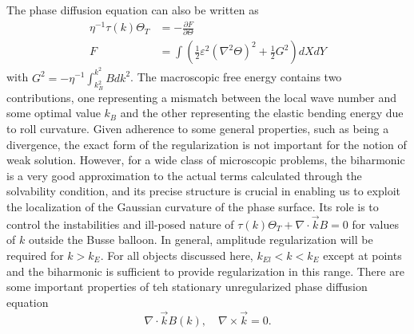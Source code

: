 \documentclass[12pt]{article}
\newcounter{problem}
\newcounter{solution}
\begin{document}
The phase diffusion equation can also be written as
\begin{align*}
    \eta^{-1}\tau(k)\Theta_T &= -\frac{\partial F}{\partial \Theta}\\
    F &= \int \left( \frac{1}{2}\varepsilon^2(\nabla^2\Theta)^2+\frac{1}{2}G^2\right)dXdY
\end{align*}
with $G^2=-\eta^{-1}\int_{k_B^2}^{k^2}Bdk^2$. \newline
The macroscopic free energy contains two contributions, one representing a mismatch between the local wave number and some optimal value $k_B$ and the other representing the elastic bending energy due to roll curvature.
\hspace*{10mm} Given adherence to some general properties, such as being a divergence, the exact form of the regularization is not important for the notion of weak solution. However, for a wide class of microscopic problems, the biharmonic is a very good approximation to the actual terms calculated through the solvability condition, and its precise structure is crucial in enabling us to exploit the localization of the Gaussian curvature of the phase surface. Its role is to control the instabilities and ill-posed nature of $\tau(k)\Theta_T + \nabla \cdot \vec{k}B=0$ for values of $k$ outside the Busse balloon. In general, amplitude regularization will be required for $k>k_E$. For all objects discussed here, $k_{El}<k<k_E$ except at points and the biharmonic is sufficient to provide regularization in this range. \newline
\hspace*{10mm} There are some important properties of teh stationary unregularized phase diffusion equation
\[
    \nabla \cdot \vec{k}B(k), \quad \nabla \times \vec{k} = 0.
\] 
\end{document}
